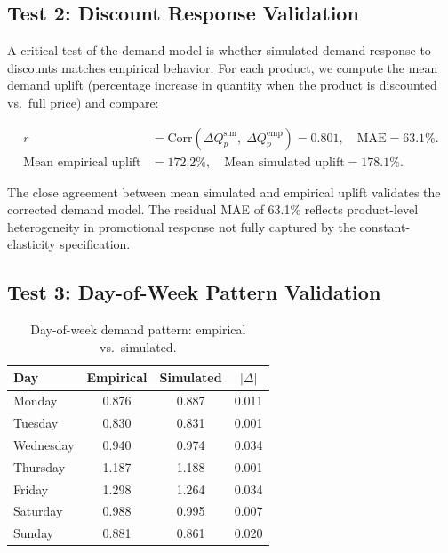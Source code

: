 \documentclass[11pt,a4paper]{article}
\begin{document}
\subsection{Test 2: Discount Response Validation}

A critical test of the demand model is whether simulated demand response to discounts matches empirical behavior.
For each product, we compute the mean demand uplift (percentage increase in quantity when the product is discounted vs.\ full price) and compare:

\begin{align}
r &= \text{Corr}\!\left(\Delta Q_p^{\text{sim}},\;\Delta Q_p^{\text{emp}}\right) = 0.801, \quad \text{MAE} = 63.1\%. \\
\text{Mean empirical uplift} &= 172.2\%, \quad \text{Mean simulated uplift} = 178.1\%.
\end{align}

The close agreement between mean simulated and empirical uplift validates the corrected demand model.
The residual MAE of 63.1\% reflects product-level heterogeneity in promotional response not fully captured by the constant-elasticity specification.

\subsection{Test 3: Day-of-Week Pattern Validation}

\begin{table}[H]
\centering
\caption{Day-of-week demand pattern: empirical vs.\ simulated.}
\begin{tabular}{@{}lccc@{}}
\toprule
\textbf{Day} & \textbf{Empirical} & \textbf{Simulated} & \textbf{$|\Delta|$} \\
\midrule
Monday & 0.876 & 0.887 & 0.011 \\
Tuesday & 0.830 & 0.831 & 0.001 \\
Wednesday & 0.940 & 0.974 & 0.034 \\
Thursday & 1.187 & 1.188 & 0.001 \\
Friday & 1.298 & 1.264 & 0.034 \\
Saturday & 0.988 & 0.995 & 0.007 \\
Sunday & 0.881 & 0.861 & 0.020 \\
\bottomrule
\end{tabular}
\end{table}
\end{document}
